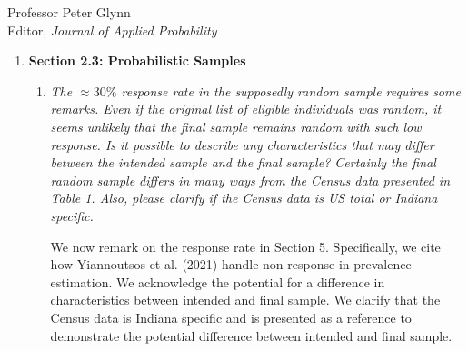 \documentclass[11pt]{letter} %
\begin{document}
\begin{letter}{Professor
	Peter Glynn\\
	Editor, {\em Journal of Applied Probability}}
\begin{enumerate}
\begin{enumerate}
	We have added Remark 3 in Section 2.2 discussing public versus government data.  Specifically, we clarify that data privacy restrictions enforce publicly released testing and case count data be aggregated by strata-level covariates and have potentially important missing information (i.e., symptom status and )
	While these choices impact our data analytic plan, we clarify that the data analytic framework is expressly designed to guide health departments and policy makers to assess the pandemic and guide future resposnes.

	\vspace{5mm}
	\item {\it A timeline of restrictions and testing eligibility would be a useful addition to Section 2.2.1. Also, what there no time period where testing in Indiana was restricted on the basis of travel history or suspected exposure?}
	\vspace{5mm}

	Section 2.2.1 has a reconstructed timeline of restrictions, which was based on reported restrictions in the local Indiana news.  Between May 12th and April 28th, only high-risk individuals (symptomatic or having one of several important risk factors) were able to test.  After April 28th, suspected exposure was included as a reason for testing. We could not find any article mention travel history as a factor for testing in the public reports.
	\vspace{5mm}
\end{enumerate}
\item {\bf Section 2.3: Probabilistic Samples}
\begin{enumerate}
	\item {\it The $\approx 30\%$ response rate in the supposedly random sample requires some remarks. Even if the original list of eligible individuals was random, it seems unlikely that the final sample remains random with such low response. Is it possible to describe any characteristics that may differ between the intended sample and the final sample? Certainly the final random sample differs in many ways from the Census data presented in Table 1. Also, please clarify if the Census data is US total or Indiana specific. }
	\vspace{5mm}

	We now remark on the response rate in Section 5.  Specifically, we cite how Yiannoutsos et al. (2021) handle non-response in prevalence estimation.  We acknowledge the potential for a difference in characteristics between intended and final sample.  We clarify that the Census data is Indiana specific and is presented as a reference to demonstrate the potential difference between intended and final sample.


\end{enumerate}
\end{enumerate}
\end{letter}
\end{document}
